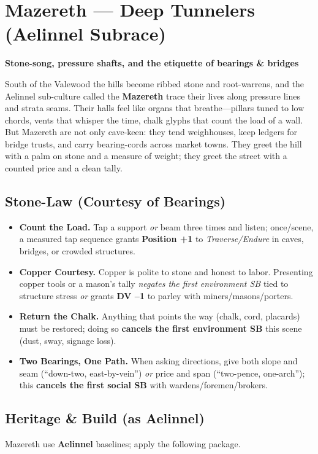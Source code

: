 \documentclass[11pt]{book}
\begin{document}
\section{Mazereth --- Deep Tunnelers (Aelinnel Subrace)}
\textbf{Stone-song, pressure shafts, and the etiquette of bearings \& bridges}

South of the Valewood the hills become ribbed stone and root-warrens, and the Aelinnel sub-culture called the \textbf{Mazereth} trace their lives along pressure lines and strata seams. Their halls feel like organs that breathe---pillars tuned to low chords, vents that whisper the time, chalk glyphs that count the load of a wall. But Mazereth are not only cave-keen: they tend weighhouses, keep ledgers for bridge trusts, and carry bearing-cords across market towns. They greet the hill with a palm on stone and a measure of weight; they greet the street with a counted price and a clean tally.

\subsection*{Stone-Law (Courtesy of Bearings)}
\begin{itemize}
    \item \textbf{Count the Load.} Tap a support \emph{or} beam three times and listen; once/scene, a measured tap sequence grants \textbf{Position +1} to \emph{Traverse/Endure} in caves, bridges, or crowded structures.
    \item \textbf{Copper Courtesy.} Copper is polite to stone and honest to labor. Presenting copper tools or a mason's tally \emph{negates the first environment SB} tied to structure stress \emph{or} grants \textbf{DV --1} to parley with miners/masons/porters.
    \item \textbf{Return the Chalk.} Anything that points the way (chalk, cord, placards) must be restored; doing so \textbf{cancels the first environment SB} this scene (dust, sway, signage loss).
    \item \textbf{Two Bearings, One Path.} When asking directions, give both slope and seam (``down-two, east-by-vein'') \emph{or} price and span (``two-pence, one-arch''); this \textbf{cancels the first social SB} with wardens/foremen/brokers.
\end{itemize}

\subsection*{Heritage \& Build (as Aelinnel)}
Mazereth use \textbf{Aelinnel} baselines; apply the following package.
\end{document}
